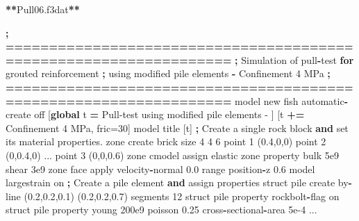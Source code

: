 \documentclass[a4paper, nobind]{templates/ociamthesis}
\newenvironment{Shaded}{\begin{snugshade}}{\end{snugshade}}
\newcommand{\BuiltInTok}[1]{#1}
\newcommand{\ControlFlowTok}[1]{\textcolor[rgb]{0.13,0.29,0.53}{\textbf{#1}}}
\newcommand{\DecValTok}[1]{\textcolor[rgb]{0.00,0.00,0.81}{#1}}
\newcommand{\FloatTok}[1]{\textcolor[rgb]{0.00,0.00,0.81}{#1}}
\newcommand{\KeywordTok}[1]{\textcolor[rgb]{0.13,0.29,0.53}{\textbf{#1}}}
\newcommand{\NormalTok}[1]{#1}
\newcommand{\OperatorTok}[1]{\textcolor[rgb]{0.81,0.36,0.00}{\textbf{#1}}}
\newcommand{\StringTok}[1]{\textcolor[rgb]{0.31,0.60,0.02}{#1}}
\renewenvironment{Shaded}
{
  \vspace{10pt}%
  \begin{snugshade}%
}{%
  \end{snugshade}%
  \vspace{8pt}%
}
\begin{document}
\begin{Shaded}
\begin{Highlighting}[]
\OperatorTok{**}\NormalTok{Pull06.f3dat}\OperatorTok{**}

    \OperatorTok{;} \OperatorTok{==================================================================}
    \OperatorTok{;}\NormalTok{   Simulation of pull}\OperatorTok{{-}}\NormalTok{test }\ControlFlowTok{for}\NormalTok{ grouted reinforcement}
    \OperatorTok{;}\NormalTok{   using modified pile elements }\OperatorTok{{-}}\NormalTok{ Confinement }\DecValTok{4}\NormalTok{ MPa}
    \OperatorTok{;} \OperatorTok{==================================================================}
\NormalTok{    model new}
\NormalTok{    fish automatic}\OperatorTok{{-}}\NormalTok{create off}
\NormalTok{    [}\KeywordTok{global}\NormalTok{ t }\OperatorTok{=}  \StringTok{\textquotesingle{}Pull{-}test using modified pile elements {-} \textquotesingle{}}\NormalTok{]}
\NormalTok{    [t }\OperatorTok{+=} \StringTok{\textquotesingle{}Confinement 4 MPa, fric=30\textquotesingle{}}\NormalTok{]}
\NormalTok{    model title [t]}
    \OperatorTok{;}\NormalTok{ Create a single rock block }\KeywordTok{and} \BuiltInTok{set}\NormalTok{ its material properties.}
\NormalTok{    zone create brick size }\DecValTok{4} \DecValTok{4} \DecValTok{6}\NormalTok{ point }\DecValTok{1}\NormalTok{ (}\FloatTok{0.4}\NormalTok{,}\DecValTok{0}\NormalTok{,}\DecValTok{0}\NormalTok{) point }\DecValTok{2}\NormalTok{ (}\DecValTok{0}\NormalTok{,}\FloatTok{0.4}\NormalTok{,}\DecValTok{0}\NormalTok{) ...}
\NormalTok{                                 point }\DecValTok{3}\NormalTok{ (}\DecValTok{0}\NormalTok{,}\DecValTok{0}\NormalTok{,}\FloatTok{0.6}\NormalTok{)}
\NormalTok{    zone cmodel assign elastic}
\NormalTok{    zone }\BuiltInTok{property}\NormalTok{ bulk }\FloatTok{5e9}\NormalTok{ shear }\FloatTok{3e9}
\NormalTok{    zone face }\BuiltInTok{apply}\NormalTok{ velocity}\OperatorTok{{-}}\NormalTok{normal }\FloatTok{0.0} \BuiltInTok{range}\NormalTok{ position}\OperatorTok{{-}}\NormalTok{z }\FloatTok{0.6}
\NormalTok{    model largestrain on}
    \OperatorTok{;}\NormalTok{ Create a pile element }\KeywordTok{and}\NormalTok{ assign properties}
\NormalTok{    struct pile create by}\OperatorTok{{-}}\NormalTok{line (}\FloatTok{0.2}\NormalTok{,}\FloatTok{0.2}\NormalTok{,}\FloatTok{0.1}\NormalTok{) (}\FloatTok{0.2}\NormalTok{,}\FloatTok{0.2}\NormalTok{,}\FloatTok{0.7}\NormalTok{) segments }\DecValTok{12}
\NormalTok{    struct pile }\BuiltInTok{property}\NormalTok{ rockbolt}\OperatorTok{{-}}\NormalTok{flag on}
\NormalTok{    struct pile }\BuiltInTok{property}\NormalTok{ young }\FloatTok{200e9}\NormalTok{ poisson }\FloatTok{0.25}\NormalTok{ cross}\OperatorTok{{-}}\NormalTok{sectional}\OperatorTok{{-}}\NormalTok{area }\FloatTok{5e{-}4}\NormalTok{ ...}

\end{Highlighting}
\end{Shaded}
\end{document}
